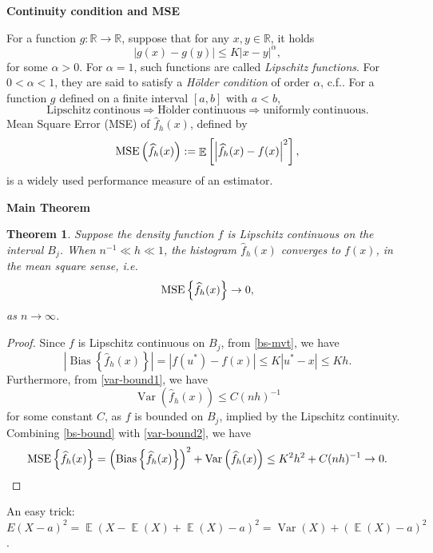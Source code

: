 \documentclass[19pt,landscape]{article}
\newtheorem{thm}{Theorem}%
\DeclareMathOperator{\E}{\mathbb{E}}
\newcommand{\R}{\mathbb{R}}
\DeclareMathOperator{\Var}{\mathrm{Var}}
\DeclareMathOperator{\var}{\mathrm{Var}}
\DeclareMathOperator{\bs}{\mathrm{Bias}}
\begin{document}
\newpage
{\LARGE\centerline{\textbf{Continuity condition and MSE}}}
\vskip25pt
\begin{minipage}{.9\textwidth}
    \Large
        For a function $g:\R\to\R$, suppose that for any $x,y\in\R$, it holds 
        \begin{equation}
            |g(x)-g(y)|\le K|x-y|^\alpha,
        \end{equation}
        for some $\alpha>0$. 
        For $\alpha=1$, such functions are called {\it Lipschitz functions}. For $0<\alpha<1$, they are said to satisfy a {\it H\"older condition} of order $\alpha$, c.f.\cite[Page~56]{Dudley02}. 
\vskip 5pt
        For a function $g$ defined on a finite interval $[a,b]$ with $a<b$, 
        $$\mathrm{Lipschitz~continous}\Rightarrow \mathrm{H\ddot{o}lder~continuous}\Rightarrow \mathrm{uniformly~continuous}.$$
Mean Square Error (MSE) of $\widehat{f}_h(x)$, defined by 
\begin{eqnarray}
    {\rm MSE}\left(\widehat{f}_h(x)\right):=\E\left[\left|\widehat{f}_h(x)-f(x)\right|^2\right],
\end{eqnarray}
is a widely used performance measure of an estimator. 
\end{minipage}

\newpage
{\LARGE\centerline{\textbf{Main Theorem}}}
\vskip25pt
\begin{minipage}{.9\textwidth}
    \large
\begin{thm}\label{thm1-L2}
    Suppose the density function $f$ is Lipschitz continuous on the interval $B_j$. When $n^{-1}\ll h\ll1$, the histogram $\widehat{f}_h(x)$ converges to $f(x)$, in the mean square sense,  i.e. 
    \begin{equation}
        {\rm MSE}\left\{\widehat{f}_h(x)\right\}\to0,
    \end{equation}
    as $n\to\infty$.
\end{thm}
\begin{proof}
    Since $f$ is Lipschitz continuous on $B_j$, from \eqref{bs-mvt}, we have
    \begin{equation}\label{bs-bound}
        \left|\bs\left\{\widehat{f}_h(x)\right\}\right|=\left|f(u^*)-f(x)\right|\le K|u^*-x|\le Kh.
    \end{equation}
    Furthermore, from \eqref{var-bound1}, we have 
    \begin{equation}\label{var-bound2}
        \var\left(\widehat{f}_h(x)\right)\le C(nh)^{-1}
    \end{equation} for some constant $C$, 
    as $f$ is bounded on $B_j$, implied by the Lipschitz continuity. Combining \eqref{bs-bound} with \eqref{var-bound2}, we have
    \begin{equation} \label{bound-mse1}
        {\rm MSE}\left\{\widehat{f}_h(x)\right\} =\left(\bs\left\{\widehat{f}_h(x)\right\}\right)^2+\var\left(\widehat{f}_h(x)\right)\le K^2h^2+C(nh)^{-1}\to0.
    \end{equation}
\end{proof}
{\small An easy trick: $E(X-a)^2=\E(X-\E(X)+\E(X)-a)^2=\Var(X)+(\E(X)-a)^2$.}
\end{minipage}
\end{document}
